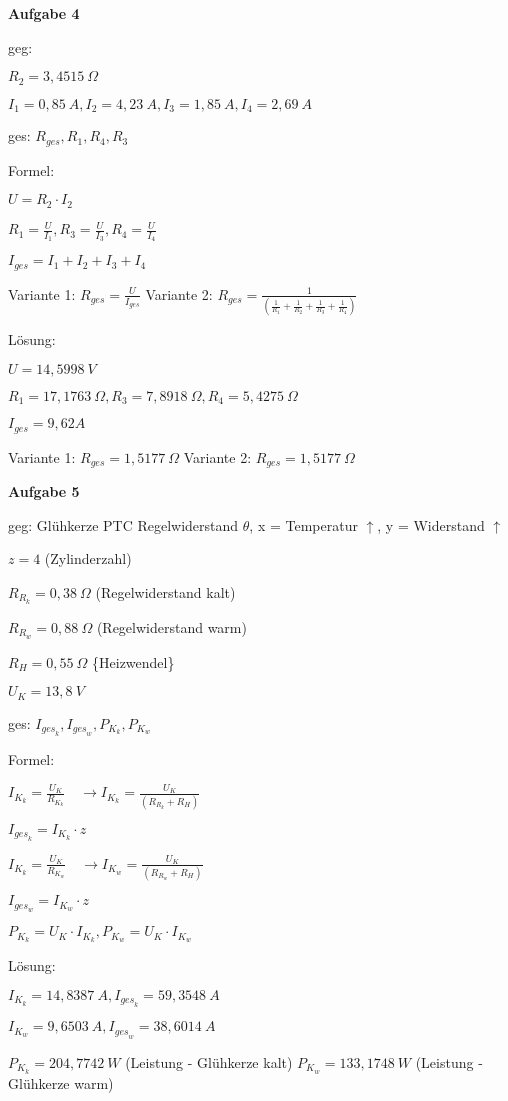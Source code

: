 \textbf{Aufgabe 4}

geg: \textbar\textbar{}

$R_2 = 3,4515~\Omega$

$I_1 = 0,85~A, I_2 = 4,23~A, I_3 = 1,85~A, I_4 = 2,69~A$

ges: $R_{ges}, R_1, R_4, R_3$

Formel:

$U = R_2 \cdot I_2$

$R_1 = \frac{U}{I_1}, R_3 = \frac{U}{I_3}, R_4 = \frac{U}{I_4}$

$I_{ges} = I_1 + I_2 + I_3 + I_4$

Variante 1: $R_{ges} = \frac{U}{I_{ges}}$ Variante 2:
$R_{ges} = \frac{1}{(\frac{1}{R_1} + \frac{1}{R_2} + \frac{1}{R_3} + \frac{1}{R_4})}$

Lösung:

$U = 14,5998~V$

$R_1 = 17,1763~\Omega, R_3 = 7,8918~\Omega, R_4 = 5,4275~\Omega$

$I_{ges} = 9,62 A$

Variante 1: $R_{ges} = 1,5177~\Omega$ Variante 2:
$R_{ges} = 1,5177~\Omega$

\newpage

\textbf{Aufgabe 5}

geg: \textbar\textbar{} Glühkerze PTC Regelwiderstand $\theta$, x =
Temperatur $\uparrow$, y = Widerstand $\uparrow$

$z = 4$ (Zylinderzahl)

$R_{R_k} = 0,38~\Omega$ (Regelwiderstand kalt)

$R_{R_w} = 0,88~\Omega$ (Regelwiderstand warm)

$R_H = 0,55~\Omega$ \{Heizwendel\}

$U_K = 13,8~V$

ges: $I_{{ges}_k}, I_{{ges}_w}, P_{K_k}, P_{K_w}$

Formel:

$I_{K_k} = \frac{U_K}{R_{K_k}} \quad \to I_{K_k} = \frac{U_K}{(R_{R_k} + R_H)}$

$I_{{ges}_k} = I_{K_k} \cdot z$

$I_{K_k} = \frac{U_K}{R_{K_w}} \quad \to I_{K_w} = \frac{U_K}{(R_{R_w} + R_H)}$

$I_{{ges}_w} = I_{K_w} \cdot z$

$P_{K_k} = U_K \cdot I_{K_k}, P_{K_w} = U_K \cdot I_{K_w}$

Lösung:

$I_{K_k} = 14,8387~A, I_{{ges}_k} = 59,3548~A$

$I_{K_w} = 9,6503~A, I_{{ges}_w} = 38,6014~A$

$P_{K_k} = 204,7742~W$ (Leistung - Glühkerze kalt)
$P_{K_w} = 133,1748~W$ (Leistung - Glühkerze warm)
